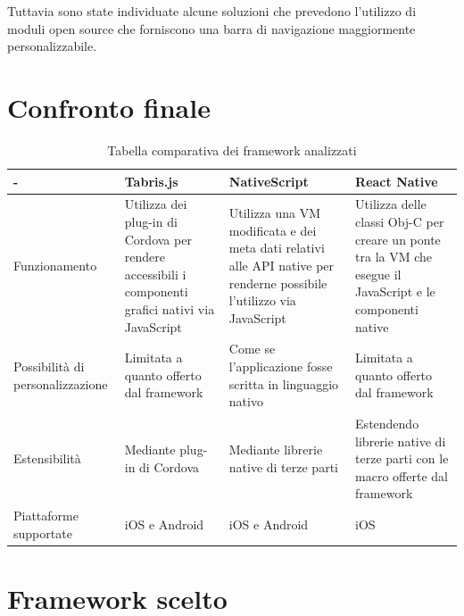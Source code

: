 Tuttavia sono state individuate alcune soluzioni che prevedono l'utilizzo di moduli open source che forniscono una barra di navigazione maggiormente personalizzabile.

\clearpage
\section{Confronto finale}

\begin{table}[h]
\centering

\begin{tabular}{|m{2.3cm}|m{3cm}|m{3cm}|m{3cm}|}
\hline - & Tabris.js & NativeScript & React Native   \\ 
\hline  

Funzionamento & Utilizza dei plug-in di Cordova per rendere accessibili i componenti grafici nativi via JavaScript & Utilizza una VM modificata e dei meta dati relativi alle API native per renderne possibile l'utilizzo via JavaScript  & Utilizza delle classi Obj-C per creare un ponte tra la VM che esegue il JavaScript e le componenti native   \\ 

\hline  

 Possibilità di personalizzazione & Limitata a quanto offerto dal framework & Come se l'applicazione fosse scritta in linguaggio nativo & Limitata a quanto offerto dal framework   \\
 
\hline 

 Estensibilità & Mediante plug-in di Cordova & Mediante librerie native di terze parti & Estendendo librerie native di terze parti con le macro offerte dal framework  \\ 

\hline

 Piattaforme supportate & iOS e Android & iOS e Android & iOS   \\

\hline

\end{tabular}

\caption{Tabella comparativa dei framework analizzati}
\label{my-label}
\end{table}

\FloatBarrier
\section{Framework scelto}

